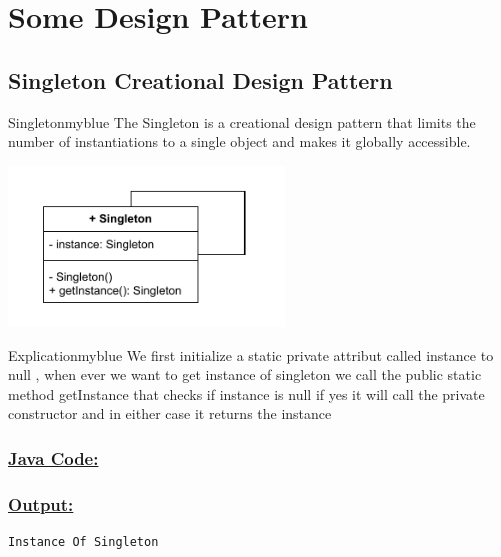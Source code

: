 \vspace{1cm}
\section{Some Design Pattern}

\subsection{Singleton Creational Design Pattern}
\begin{prettyBox}{Singleton}{myblue}
The Singleton is a creational design pattern that limits the number of instantiations to
a single object and makes it globally accessible.
\end{prettyBox}

\begin{center}
\includegraphics[width=0.55\textwidth]{Chapters/DesignPattern/Singleton/single.drawio.pdf}
\end{center}

\begin{prettyBox}{Explication}{myblue}
We first initialize a static private attribut called instance to null , when ever we want to get instance of singleton
we call the public static method getInstance that checks if instance is null if yes it will call the private constructor
and in either case it returns the instance 
\end{prettyBox}

\newpage
\subsubsection*{\underline{Java Code:}}



\vspace{0.5cm}



\subsubsection*{\underline{Output:}}
\begin{lstlisting}[style=cmd]
Instance Of Singleton
\end{lstlisting}


